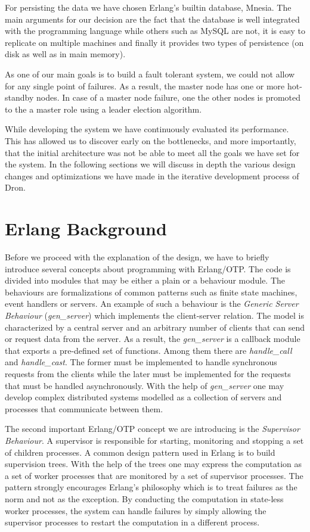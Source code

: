 \documentclass[11pt,a4paper,twoside]{report}
\begin{document}
For persisting the data we have chosen Erlang's builtin database, Mnesia. The main arguments for our decision are the fact that the database is well integrated with the programming language while others such as MySQL are not, it is easy to replicate on multiple machines and finally it provides two types of persistence (on disk as well as in main memory).


As one of our main goals is to build a fault tolerant system, we could not allow for any single point of failures. As a result, the master node has one or more hot-standby nodes. In case of a master node failure, one the other nodes is promoted to the a master role using a leader election algorithm.


While developing the system we have continuously evaluated its performance. This has allowed us to discover early on the bottlenecks, and more importantly, that the initial architecture was not be able to meet all the goals we have set for the system. In the following sections we will discuss in depth the various design changes and optimizations we have made in the iterative development process of Dron.

\section{Erlang Background}
Before we proceed with the explanation of the design, we have to briefly introduce several concepts about programming with Erlang/OTP. The code is divided into modules that may be either a plain or a behaviour module. The behaviours are formalizations of common patterns such as finite state machines, event handlers or servers. An example of such a behaviour is the \textit{Generic Server Behaviour} (\textit{gen\_server}) which implements the client-server relation. The model is characterized by a central server and an arbitrary number of clients that can send or request data from the server. As a result, the \textit{gen\_server} is a callback module that exports a pre-defined set of functions. Among them there are \textit{handle\_call} and \textit{handle\_cast}. The former must be implemented to handle synchronous requests from the clients while the later must be implemented for the requests that must be handled asynchronously. With the help of \textit{gen\_server} one may develop complex distributed systems modelled as a collection of servers and processes that communicate between them.


The second important Erlang/OTP concept we are introducing is the \textit{Supervisor Behaviour}. A supervisor is responsible for starting, monitoring and stopping a set of children processes. A common design pattern used in Erlang is to build supervision trees. With the help of the trees one may express the computation as a set of worker processes that are monitored by a set of supervisor processes. The pattern strongly encourages Erlang's philosophy which is to treat failures as the norm and not as the exception. By conducting the computation in state-less worker processes, the system can handle failures by simply allowing the supervisor processes to restart the computation in a different process.
\end{document}
